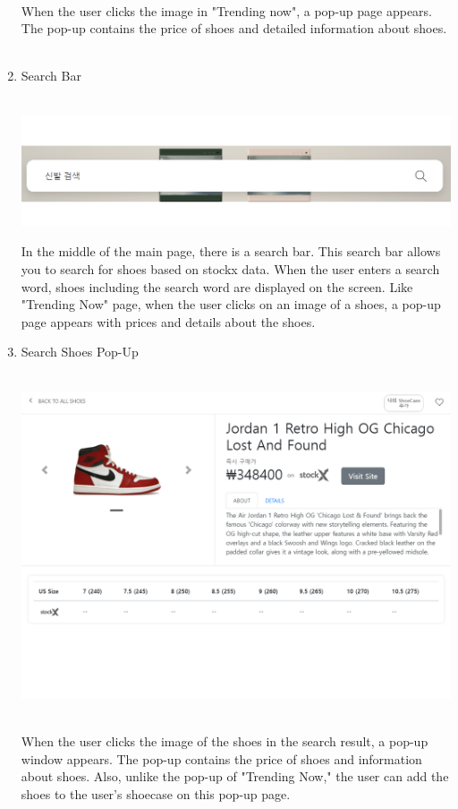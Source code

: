 \documentclass[conference]{IEEEtran}
\begin{document}
\begin{enumerate}
\\When the user clicks the image in "Trending now", a pop-up page appears. The pop-up contains the price of shoes and detailed information about shoes.\\\\
	\item Search Bar \\\\
\centerline{\includegraphics[scale=0.35]{pics/searchbar.png}}
In the middle of the main page, there is a search bar. This search bar allows you to search for shoes based on stockx data. When the user enters a search word, shoes including the search word are displayed on the screen. Like "Trending Now" page, when the user clicks on an image of a shoes, a pop-up page appears with prices and details about the shoes.\\
	\item Search Shoes Pop-Up\\
\\\centerline{\includegraphics[scale=0.35]{pics/search_detail.png}}
\\When the user clicks the image of the shoes in the search result, a pop-up window appears. The pop-up contains the price of shoes and information about shoes. Also, unlike the pop-up of "Trending Now," the user can add the shoes to the user's shoecase on this pop-up page. \\

\end{enumerate}
\end{document}
